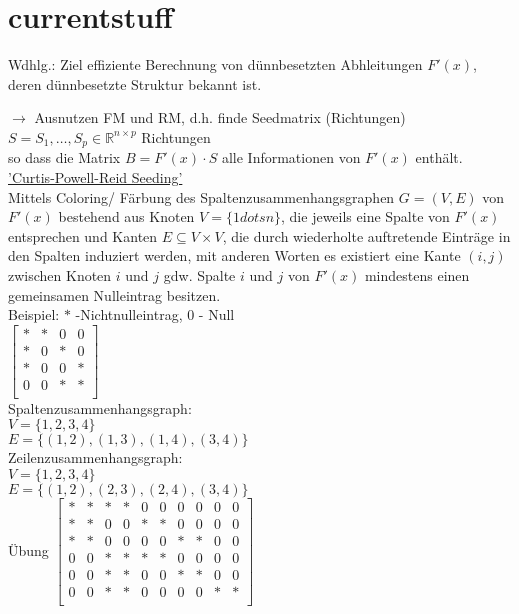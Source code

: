 %

\section{currentstuff}

Wdhlg.: Ziel effiziente Berechnung von dünnbesetzten Abhleitungen $F'(x)$, deren dünnbesetzte Struktur bekannt ist.

$\rightarrow$ Ausnutzen FM und RM, d.h. finde Seedmatrix (Richtungen)
$S = S_1, \dots , S_p \in \mathbb{R}^{n\times p}$ Richtungen \\
so dass die Matrix $B=F'(x) \cdot S$ alle Informationen von $F'(x)$ enthält.\\

\noindent
\underline{'Curtis-Powell-Reid Seeding'}\\
Mittels Coloring/ Färbung des Spaltenzusammenhangsgraphen $G=(V,E)$ von $F'(x)$ bestehend aus Knoten $V=\{1dots n\}$, die jeweils eine Spalte von $F'(x)$ entsprechen und Kanten $E\subseteq V\times V$, die durch wiederholte auftretende Einträge in den Spalten induziert werden, mit anderen Worten es existiert eine Kante $(i,j)$ zwischen Knoten $i$ und $j$ gdw. Spalte $i$ und $j$ von $F'(x)$ mindestens einen gemeinsamen Nulleintrag besitzen.\\

\noindent
Beispiel: $*$ -Nichtnulleintrag, $0$ - Null\\
$\begin{bmatrix}
*	& *	& 0	& 0	\\
*	& 0	& *	& 0	\\
*	& 0	& 0	& *	\\
0	& 0	& *	& *	\\
\end{bmatrix}
$\\
Spaltenzusammenhangsgraph:\\
$V=\{1,2,3,4\}$\\
$E=\{(1,2),(1,3),(1,4),(3,4)\}$\\
Zeilenzusammenhangsgraph:\\
$V=\{1,2,3,4\}$\\
$E=\{(1,2),(2,3),(2,4),(3,4)\}$\\

Übung
$\begin{bmatrix}
 *	& *	& *	& *	& 0	& 0	& 0	& 0	& 0	& 0\\
 *	& *	& 0	& 0	& *	& *	& 0	& 0	& 0	& 0\\
 *	& *	& 0	& 0	& 0	& 0	& *	& *	& 0	& 0\\
 0	& 0	& *	& *	& *	& *	& 0	& 0	& 0	& 0\\
 0	& 0	& *	& *	& 0	& 0	& * & *	& 0	& 0\\
 0	& 0	& *	& *	& 0	& 0	& 0 & 0	& *	& *\\
\end{bmatrix}$\\

